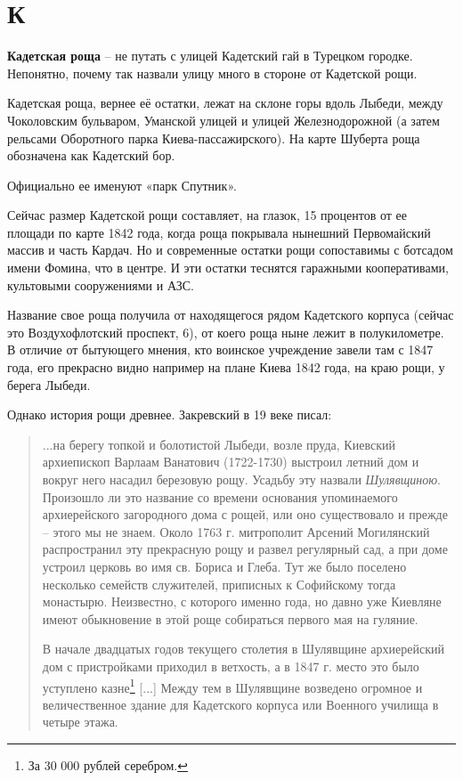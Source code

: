 \chapter*{К}

\textbf{Кадетская роща} – не путать с улицей Кадетский гай в Турецком городке. Непонятно, почему так назвали улицу много в стороне от Кадетской рощи.

Кадетская роща, вернее её остатки, лежат на склоне горы вдоль Лыбеди, между Чоколовским бульваром, Уманской улицей и улицей Железнодорожной (а затем рельсами Оборотного парка Киева-пассажирского). На карте Шуберта роща обозначена как Кадетский бор.

Официально ее именуют «парк Спутник».

Сейчас размер Кадетской рощи составляет, на глазок, 15 процентов от ее площади по карте 1842 года, когда роща покрывала нынешний Первомайский массив и часть Кардач. Но и современные остатки рощи сопоставимы с ботсадом имени Фомина, что в центре. И эти остатки теснятся гаражными кооперативами, культовыми сооружениями и АЗС.

Название свое роща получила от находящегося рядом Кадетского корпуса (сейчас это Воздухофлотский проспект, 6), от коего роща ныне лежит в полукилометре. В отличие от бытующего мнения, кто воинское учреждение завели там с 1847 года, его прекрасно видно например на плане Киева 1842 года, на краю рощи, у берега Лыбеди.

Однако история рощи древнее. Закревский в 19 веке писал:

\begin{quotation}
...на берегу топкой и болотистой Лыбеди, возле пруда, Киевский архиепископ Варлаам Ванатович (1722-1730) выстроил летний дом и вокруг него насадил березовую рощу. Усадьбу эту назвали \textit{Шулявщиною}. Произошло ли это название со времени основания упоминаемого архиерейского загородного дома с рощей, или оно существовало и прежде – этого мы не знаем. Около 1763 г. митрополит Арсений Могилянский распространил эту прекрасную рощу и развел регулярный сад, а при доме устроил церковь во имя св. Бориса и Глеба. Тут же было поселено несколько семейств служителей, приписных к Софийскому тогда монастырю. Неизвестно, с которого именно года, но давно уже Киевляне имеют обыкновение в этой роще собираться первого мая на гуляние.

В начале двадцатых годов текущего столетия в Шулявщине архиерейский дом с пристройками приходил в ветхость, а в 1847 г. место это было уступлено казне\footnote{За 30 000 рублей серебром.} [...] Между тем в Шулявщине возведено огромное и величественное здание для Кадетского корпуса или Военного училища в четыре этажа.
\end{quotation}

